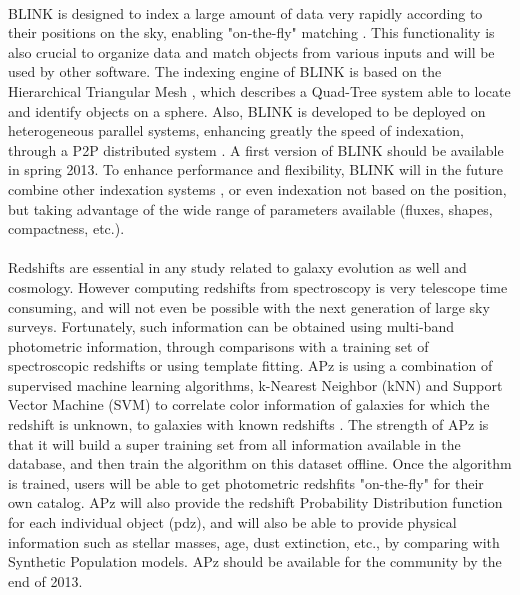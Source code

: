 \\
BLINK is designed to index a large amount of data very rapidly according to their positions on the sky, enabling "on-the-fly" matching \citep{blink}. This functionality is also crucial to organize data and match objects from various inputs and will be used by other software.
The indexing engine of BLINK is based on the Hierarchical Triangular Mesh \citep[HTM -][]{htm}, which describes a Quad-Tree system able to locate and identify objects on a sphere. Also, BLINK is developed to be deployed on heterogeneous parallel systems, enhancing greatly the speed of indexation, through a P2P distributed system \citep[c.f.][]{tang10}. A first version of BLINK should be available in spring 2013.
To enhance performance and flexibility, BLINK will in the future combine other indexation systems \citep[HEALPix -][]{healpix}, or even indexation not based on the position, but taking advantage of the wide range of parameters available (fluxes, shapes, compactness, etc.).\\

\\
Redshifts are essential in any study related to galaxy evolution as well and cosmology. However computing redshifts from spectroscopy is very telescope time consuming, and will not even be possible with the next generation of large sky surveys. Fortunately, such information can be obtained using multi-band photometric information, through comparisons with a training set of spectroscopic redshifts or using template fitting.
APz is using a combination of supervised machine learning algorithms, k-Nearest Neighbor (kNN) and Support Vector Machine (SVM) to correlate color information of galaxies for which the redshift is unknown, to galaxies with known redshifts \citep[refer to e.g.,][]{bb10}. The strength of APz is that it will build a super training set from all information available in the database, and then train the algorithm on this dataset offline. Once the algorithm is trained, users will be able to get photometric redshfits "on-the-fly" for their own catalog. APz will also provide the redshift Probability Distribution function for each individual object (pdz), and will also be able to provide physical information such as stellar masses, age, dust extinction, etc., by comparing with Synthetic Population models. APz should be available for the community by the end of 2013.\\

